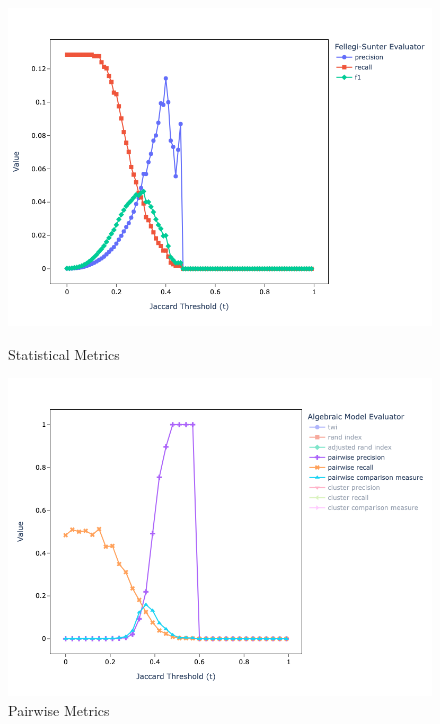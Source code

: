 \documentclass[lettersize,journal]{IEEEtran}
\begin{document}
    \begin{figure}[h!]
        \begin{minipage}{0.49\textwidth}
            \centering
            \includegraphics[width=\textwidth]{full-fs}
            \caption{Statistical Metrics}
            \label{fig:full-fs}
        \end{minipage}
        \begin{minipage}{0.49\textwidth}
            \centering
            \includegraphics[width=\textwidth]{full-alg-pp}
            \caption{Pairwise Metrics}
            \label{fig:full-alg-pp}
        \end{minipage}    
        \begin{minipage}{0.49\textwidth}

\end{minipage}
\end{figure}
\end{document}
